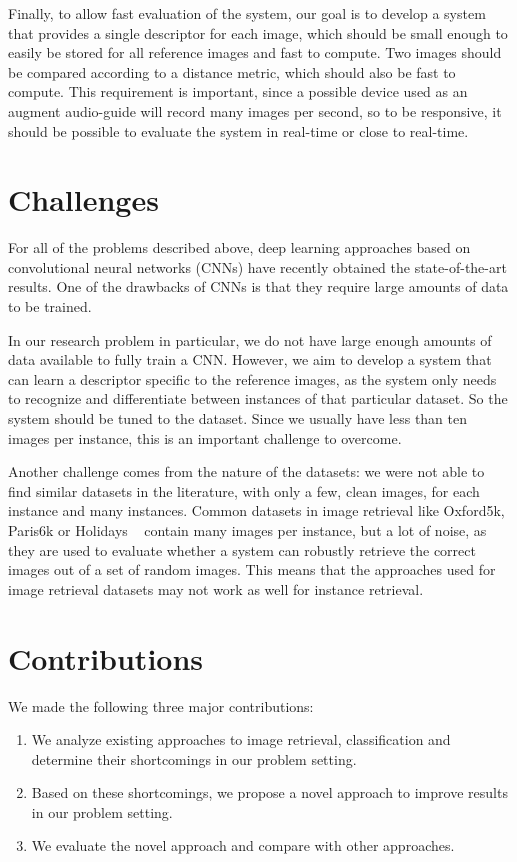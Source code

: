 Finally, to allow fast evaluation of the system, our goal is to develop
a system that provides a single descriptor for each image, which should
be small enough to easily be stored for all reference images and fast
to compute.
Two images should be compared according to a distance metric, which should
also be fast to compute. This requirement is important, since a possible
device used as an augment audio-guide will record many images per second,
so to be responsive, it should be possible to evaluate the system in
real-time or close to real-time.


\section{Challenges}
For all of the problems described above, deep learning approaches
based on convolutional neural networks (CNNs) have recently obtained
the state-of-the-art results. One of the drawbacks of CNNs is that
they require large amounts of data to be trained.

In our research problem in particular, we do not
have large enough amounts of data available to fully train a CNN.
However, we aim to develop a system that can learn a descriptor
specific to the reference images,
as the system only needs to recognize and differentiate between
instances of that particular dataset. So the system should be tuned to
the dataset. Since we usually have less than ten images per instance,
this is an important challenge to overcome.

Another challenge comes from the nature of the datasets: we were not
able to find similar datasets in the literature, with only a few,
clean images, for each instance and many instances.
Common datasets in image retrieval like Oxford5k, Paris6k or Holidays
~\cite{philbin_object_2007,philbin_lost_2008,jegou_hamming_2008}
contain many images per instance, but a lot of noise,
as they are used to evaluate whether a system can robustly retrieve the
correct images out of a set of random images.
This means that the approaches used for image retrieval datasets may
not work as well for instance retrieval.

\section{Contributions}
We made the following three major contributions:
\begin{enumerate}
    \item We analyze existing approaches to image retrieval, classification
    and determine their shortcomings in our problem setting.
    \item Based on these shortcomings, we propose a novel approach
    to improve results in our problem setting.
    \item We evaluate the novel approach and compare with other approaches.
\end{enumerate}
